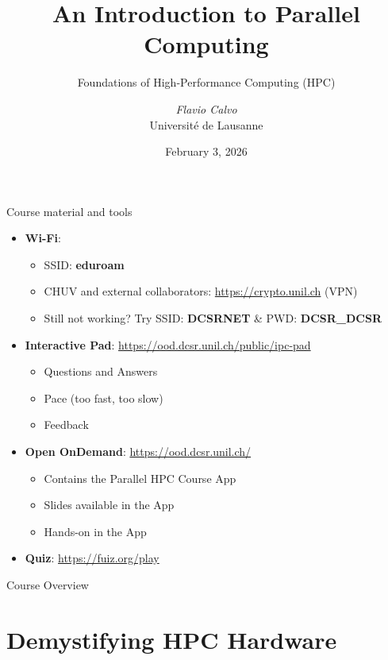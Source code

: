 \documentclass[aspectratio=169,xcolor={dvipsnames}]{beamer}
\title{An Introduction to Parallel Computing}
\subtitle{\Large Foundations of High-Performance Computing (HPC)}
\author{\emph{Flavio Calvo} \\ Université de Lausanne}
\date{February 3, 2026}
\begin{document}
\begin{frame}[plain]
    \titlepage
\end{frame}

\begin{frame}{Course material and tools}
    \vspace{-1em}
	\begin{itemize}
		\item \textbf{Wi-Fi}:
		\begin{itemize}
            \scriptsize
			\item SSID: \textbf{eduroam}
			\item CHUV and external collaborators: \url{https://crypto.unil.ch} (VPN)
			\item Still not working? Try SSID: \textbf{DCSRNET} \& PWD: \textbf{DCSR\_DCSR}
		\end{itemize}
		\item \textbf{Interactive Pad}: {\scriptsize \url{https://ood.dcsr.unil.ch/public/ipc-pad}}
		\begin{itemize}
            \scriptsize
			\item Questions and Answers
			\item Pace (too fast, too slow)
			\item Feedback
		\end{itemize}
		\item \textbf{Open OnDemand}: {\scriptsize \url{https://ood.dcsr.unil.ch/}}
		\begin{itemize}
            \scriptsize
			\item Contains the Parallel HPC Course App
			\item Slides available in the App
			\item Hands-on in the App
		\end{itemize}
		\item \textbf{Quiz}: {\scriptsize \url{https://fuiz.org/play}}
	\end{itemize}
\end{frame}

\begin{frame}{Course Overview}
    \tableofcontents
\end{frame}

\section{Demystifying HPC Hardware}
\end{document}
